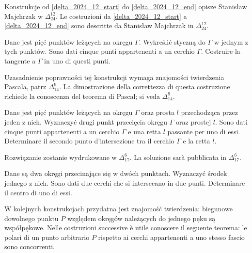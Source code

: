 %

Konstrukcje od \ref{delta_2024_12_start} do \ref{delta_2024_12_end} opisze Stanisław Majchrzak w $\Delta_{24}^{12}$. %
Le costruzioni da \ref{delta_2024_12_start} a \ref{delta_2024_12_end} sono descritte da Stanisław Majchrzak in $\Delta_{24}^{12}$. %

\begin{geoconstruction}
\label{delta_2024_12_start}%
    Dane jest pięć punktów leżących na okręgu $\Gamma$. %
    Wykreślić styczną do $\Gamma$ w jednym z tych punktów. %
    Sono dati cinque punti appartenenti a un cerchio $\Gamma$. %
    Costruire la tangente a $\Gamma$ in uno di questi punti. %
\end{geoconstruction}

Uzasadnienie poprawności tej konstrukcji wymaga znajomości twierdzenia Pascala, patrz $\Delta_{14}^9$. %
La dimostrazione della correttezza di questa costruzione richiede la conoscenza del teorema di Pascal; si veda $\Delta_{14}^9$. %

\begin{geoconstruction}
    Dane jest pięć punktów leżących na okręgu $\Gamma$ oraz prosta $l$ przechodząca przez jeden z nich. %
    Wyznaczyć drugi punkt przecięcia okręgu $\Gamma$ oraz prostej $l$. %
    Sono dati cinque punti appartenenti a un cerchio $\Gamma$ e una retta $l$ passante per uno di essi. %
    Determinare il secondo punto d'intersezione tra il cerchio $\Gamma$ e la retta $l$. %
\end{geoconstruction}

Rozwiązanie zostanie wydrukowane w $\Delta_{17}^6$. %
La soluzione sarà pubblicata in $\Delta_{17}^6$. %

\begin{geoconstruction}
    Dane są dwa okręgi przecinające się w dwóch punktach. %
    Wyznaczyć środek jednego z nich. %
    Sono dati due cerchi che si intersecano in due punti. %
    Determinare il centro di uno di essi. %
\end{geoconstruction}

W kolejnych konstrukcjach przydatna jest znajomość twierdzenia: biegunowe dowolnego punktu $P$ względem okręgów należących do jednego pęku są współpękowe. %
Nelle costruzioni successive è utile conoscere il seguente teorema: le polari di un punto arbitrario $P$ rispetto ai cerchi appartenenti a uno stesso fascio sono concorrenti. %

